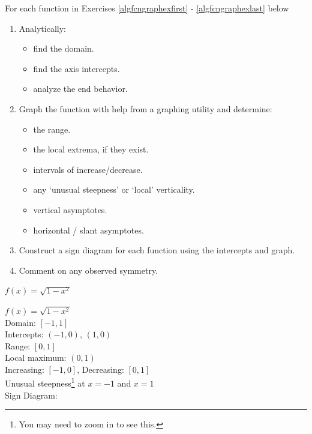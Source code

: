 \documentclass{ximera}
\begin{document}
\begin{question}
    For each function in Exercises \ref{algfcngraphexfirst} - \ref{algfcngraphexlast} below 

\begin{enumerate}

\item Analytically:


\begin{itemize}

\item find the domain.

\item find the axis intercepts.

\item analyze the end behavior.

\end{itemize}



\item Graph the function with help from a graphing utility and determine:


\begin{itemize}

\item  the range.

\item the local extrema, if they exist.

\item intervals of increase/decrease.

\item any `unusual steepness' or `local' verticality.

\item  vertical asymptotes.

\item  horizontal / slant asymptotes.

\end{itemize}

\item Construct a sign diagram for each function using the intercepts and graph.

\item  Comment on any observed symmetry.

\end{enumerate}


\begin{problem} \label{algfcngraphexfirst}
$f(x) = \sqrt{1 - x^{2}}$

\begin{solution}
$f(x) = \sqrt{1 - x^2}$\\
Domain: $[-1, 1]$\\
Intercepts: $(-1,0)$, $(1,0)$ \\
Range: $[0,1]$\\
Local maximum: $(0,1)$\\
Increasing: $[-1,0]$, Decreasing: $[0,1]$\\
Unusual steepness\footnote{You may need to zoom in to see this.} at $x = -1$ and $x = 1$\\
Sign Diagram: \\



\end{solution}
\end{problem}
\end{question}
\end{document}
